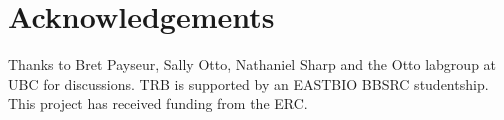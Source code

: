 \section{Acknowledgements}

Thanks to Bret Payseur, Sally Otto, Nathaniel Sharp and the Otto labgroup at UBC for discussions. TRB is supported by an EASTBIO BBSRC studentship. This project has received funding from the ERC.

% 
%
%


%

%

